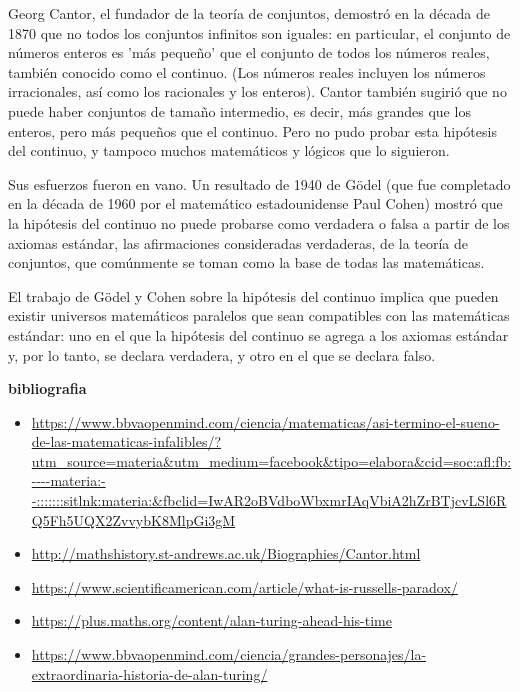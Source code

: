 \documentclass[12pt]{article}
\begin{document}
\vspace{15PT}
Georg Cantor, el fundador de la teoría de conjuntos, demostró en la década de 1870 que no todos los conjuntos infinitos son iguales: en particular, el conjunto de números enteros es 'más pequeño' que el conjunto de todos los números reales, también conocido como el continuo. (Los números reales incluyen los números irracionales, así como los racionales y los enteros). Cantor también sugirió que no puede haber conjuntos de tamaño intermedio, es decir, más grandes que los enteros, pero más pequeños que el continuo. Pero no pudo probar esta hipótesis del continuo, y tampoco muchos matemáticos y lógicos que lo siguieron.

\vspace{15PT}
Sus esfuerzos fueron en vano. Un resultado de 1940 de Gödel (que fue completado en la década de 1960 por el matemático estadounidense Paul Cohen) mostró que la hipótesis del continuo no puede probarse como verdadera o falsa a partir de los axiomas estándar, las afirmaciones consideradas verdaderas, de la teoría de conjuntos, que comúnmente se toman como la base de todas las matemáticas.

\vspace{15PT}
El trabajo de Gödel y Cohen sobre la hipótesis del continuo implica que pueden existir universos matemáticos paralelos que sean compatibles con las matemáticas estándar: uno en el que la hipótesis del continuo se agrega a los axiomas estándar y, por lo tanto, se declara verdadera, y otro en el que se declara falso.

\newpage
\bf{\sc\Huge bibliografia }\\
\begin{itemize}
\item  \url{https://www.bbvaopenmind.com/ciencia/matematicas/asi-termino-el-sueno-de-las-matematicas-infalibles/?utm_source=materia&utm_medium=facebook&tipo=elabora&cid=soc:afl:fb:----materia:--:::::::sitlnk:materia:&fbclid=IwAR2oBVdboWbxmrIAqVbiA2hZrBTjcvLSl6RQ5Fh5UQX2ZvvybK8MlpGi3gM}
    \item \url{http://mathshistory.st-andrews.ac.uk/Biographies/Cantor.html}
    \item \url{https://www.scientificamerican.com/article/what-is-russells-paradox/}
    \item \url{https://plus.maths.org/content/alan-turing-ahead-his-time}
    \item \url{https://www.bbvaopenmind.com/ciencia/grandes-personajes/la-extraordinaria-historia-de-alan-turing/}

\end{itemize}
\end{document}
